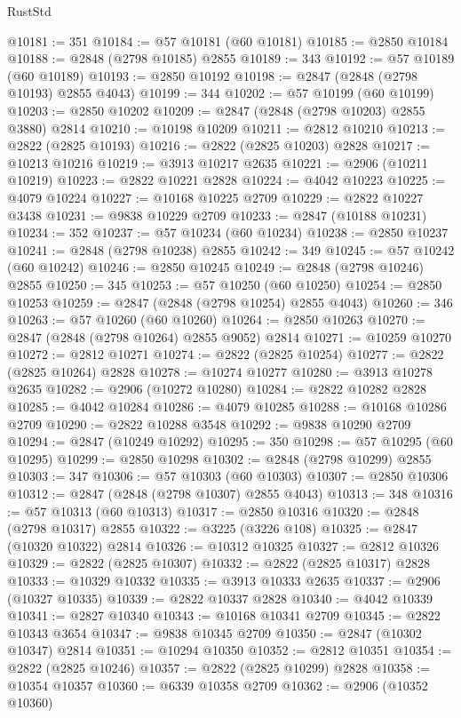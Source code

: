 \begin{lexlean}{RustStd}
\begin{coremodule}
@10181 := 351
@10184 := @57 @10181 (@60 @10181)
@10185 := @2850 @10184
@10188 := @2848 (@2798 @10185) @2855
@10189 := 343
@10192 := @57 @10189 (@60 @10189)
@10193 := @2850 @10192
@10198 := @2847 (@2848 (@2798 @10193) @2855 @4043)
@10199 := 344
@10202 := @57 @10199 (@60 @10199)
@10203 := @2850 @10202
@10209 := @2847 (@2848 (@2798 @10203) @2855 @3880) @2814
@10210 := @10198 @10209
@10211 := @2812 @10210
@10213 := @2822 (@2825 @10193)
@10216 := @2822 (@2825 @10203) @2828
@10217 := @10213 @10216
@10219 := @3913 @10217 @2635
@10221 := @2906 (@10211 @10219)
@10223 := @2822 @10221 @2828
@10224 := @4042 @10223
@10225 := @4079 @10224
@10227 := @10168 @10225 @2709
@10229 := @2822 @10227 @3438
@10231 := @9838 @10229 @2709
@10233 := @2847 (@10188 @10231)
@10234 := 352
@10237 := @57 @10234 (@60 @10234)
@10238 := @2850 @10237
@10241 := @2848 (@2798 @10238) @2855
@10242 := 349
@10245 := @57 @10242 (@60 @10242)
@10246 := @2850 @10245
@10249 := @2848 (@2798 @10246) @2855
@10250 := 345
@10253 := @57 @10250 (@60 @10250)
@10254 := @2850 @10253
@10259 := @2847 (@2848 (@2798 @10254) @2855 @4043)
@10260 := 346
@10263 := @57 @10260 (@60 @10260)
@10264 := @2850 @10263
@10270 := @2847 (@2848 (@2798 @10264) @2855 @9052) @2814
@10271 := @10259 @10270
@10272 := @2812 @10271
@10274 := @2822 (@2825 @10254)
@10277 := @2822 (@2825 @10264) @2828
@10278 := @10274 @10277
@10280 := @3913 @10278 @2635
@10282 := @2906 (@10272 @10280)
@10284 := @2822 @10282 @2828
@10285 := @4042 @10284
@10286 := @4079 @10285
@10288 := @10168 @10286 @2709
@10290 := @2822 @10288 @3548
@10292 := @9838 @10290 @2709
@10294 := @2847 (@10249 @10292)
@10295 := 350
@10298 := @57 @10295 (@60 @10295)
@10299 := @2850 @10298
@10302 := @2848 (@2798 @10299) @2855
@10303 := 347
@10306 := @57 @10303 (@60 @10303)
@10307 := @2850 @10306
@10312 := @2847 (@2848 (@2798 @10307) @2855 @4043)
@10313 := 348
@10316 := @57 @10313 (@60 @10313)
@10317 := @2850 @10316
@10320 := @2848 (@2798 @10317) @2855
@10322 := @3225 (@3226 @108)
@10325 := @2847 (@10320 @10322) @2814
@10326 := @10312 @10325
@10327 := @2812 @10326
@10329 := @2822 (@2825 @10307)
@10332 := @2822 (@2825 @10317) @2828
@10333 := @10329 @10332
@10335 := @3913 @10333 @2635
@10337 := @2906 (@10327 @10335)
@10339 := @2822 @10337 @2828
@10340 := @4042 @10339
@10341 := @2827 @10340
@10343 := @10168 @10341 @2709
@10345 := @2822 @10343 @3654
@10347 := @9838 @10345 @2709
@10350 := @2847 (@10302 @10347) @2814
@10351 := @10294 @10350
@10352 := @2812 @10351
@10354 := @2822 (@2825 @10246)
@10357 := @2822 (@2825 @10299) @2828
@10358 := @10354 @10357
@10360 := @6339 @10358 @2709
@10362 := @2906 (@10352 @10360)

\end{coremodule}
\end{lexlean}
